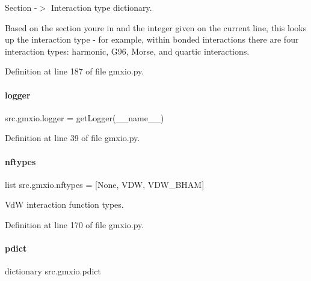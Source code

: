 Section -\/$>$ Interaction type dictionary. 

Based on the section you\textquotesingle{}re in and the integer given on the current line, this looks up the \textquotesingle{}interaction type\textquotesingle{} -\/ for example, within bonded interactions there are four interaction types\+: harmonic, G96, Morse, and quartic interactions. 

Definition at line 187 of file gmxio.\+py.

\mbox{\label{namespacesrc_1_1gmxio_af4ece92231f8ad70afc1a559065eec80}} 
\paragraph{\texorpdfstring{logger}{logger}}
{\footnotesize\ttfamily src.\+gmxio.\+logger = get\+Logger(\+\_\+\+\_\+name\+\_\+\+\_\+)}



Definition at line 39 of file gmxio.\+py.

\mbox{\label{namespacesrc_1_1gmxio_aa7357cfd306beaec9404d74d21e5729e}} 
\paragraph{\texorpdfstring{nftypes}{nftypes}}
{\footnotesize\ttfamily list src.\+gmxio.\+nftypes = \mbox{[}None, \textquotesingle{}V\+DW\textquotesingle{}, \textquotesingle{}V\+D\+W\+\_\+\+B\+H\+AM\textquotesingle{}\mbox{]}}



VdW interaction function types. 



Definition at line 170 of file gmxio.\+py.

\mbox{\label{namespacesrc_1_1gmxio_ad55e036d51846e3440a373c57439dffa}} 
\paragraph{\texorpdfstring{pdict}{pdict}}
{\footnotesize\ttfamily dictionary src.\+gmxio.\+pdict}



